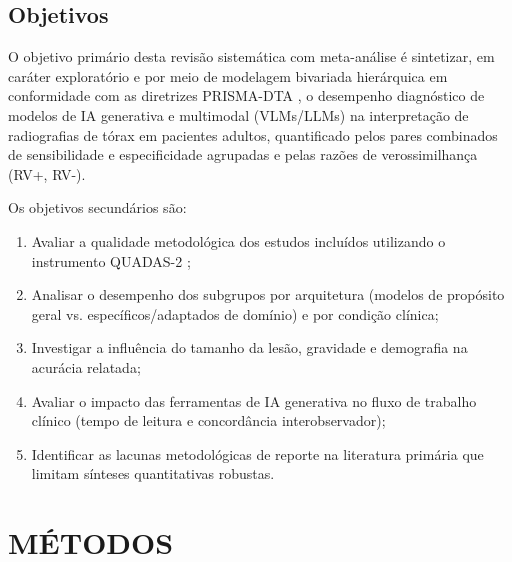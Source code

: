 \documentclass[12pt,a4paper]{article}
\begin{document}
\subsection{Objetivos}
O objetivo primário desta revisão sistemática com meta-análise é sintetizar, em caráter exploratório e por meio de modelagem bivariada hierárquica em conformidade com as diretrizes PRISMA-DTA \cite{mcinnes}, o desempenho diagnóstico de modelos de IA generativa e multimodal (VLMs/LLMs) na interpretação de radiografias de tórax em pacientes adultos, quantificado pelos pares combinados de sensibilidade e especificidade agrupadas e pelas razões de verossimilhança (RV+, RV-). 

Os objetivos secundários são:
\begin{enumerate}
    \item Avaliar a qualidade metodológica dos estudos incluídos utilizando o instrumento QUADAS-2 \cite{whiting};
    \item Analisar o desempenho dos subgrupos por arquitetura (modelos de propósito geral vs. específicos/adaptados de domínio) e por condição clínica;
    \item Investigar a influência do tamanho da lesão, gravidade e demografia na acurácia relatada;
    \item Avaliar o impacto das ferramentas de IA generativa no fluxo de trabalho clínico (tempo de leitura e concordância interobservador);
    \item Identificar as lacunas metodológicas de reporte na literatura primária que limitam sínteses quantitativas robustas.
\end{enumerate}

\newpage
\section{MÉTODOS}
\end{document}
